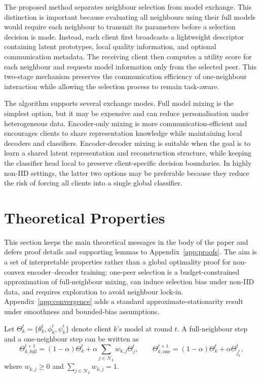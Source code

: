 \documentclass[conference]{IEEEtran}
\begin{document}
The proposed method separates neighbour selection from model exchange. This distinction is important because evaluating all neighbours using their full models would require each neighbour to transmit its parameters before a selection decision is made. Instead, each client first broadcasts a lightweight descriptor containing latent prototypes, local quality information, and optional communication metadata. The receiving client then computes a utility score for each neighbour and requests model information only from the selected peer. This two-stage mechanism preserves the communication efficiency of one-neighbour interaction while allowing the selection process to remain task-aware.

The algorithm supports several exchange modes. Full model mixing is the simplest option, but it may be expensive and can reduce personalisation under heterogeneous data. Encoder-only mixing is more communication-efficient and encourages clients to share representation knowledge while maintaining local decoders and classifiers. Encoder-decoder mixing is suitable when the goal is to learn a shared latent representation and reconstruction structure, while keeping the classifier head local to preserve client-specific decision boundaries. In highly non-IID settings, the latter two options may be preferable because they reduce the risk of forcing all clients into a single global classifier.

\section{Theoretical Properties}
\label{sec:theory}

This section keeps the main theoretical messages in the body of the paper and defers proof details and supporting lemmas to Appendix~\ref{app:proofs}. The aim is a set of interpretable properties rather than a global optimality proof for non-convex encoder--decoder training: one-peer selection is a budget-constrained approximation of full-neighbour mixing, can induce selection bias under non-IID data, and requires exploration to avoid neighbour lock-in. Appendix~\ref{app:convergence} adds a standard approximate-stationarity result under smoothness and bounded-bias assumptions.

Let $\Theta_k^t=\{\theta_k^t,\phi_k^t,\psi_k^t\}$ denote client $k$'s model at round $t$. A full-neighbour step and a one-neighbour step can be written as
\[
\Theta_{k,\mathrm{full}}^{t+1}
=(1-\alpha)\Theta_k^t
+\alpha\sum_{j\in\mathcal{N}_k}w_{k,j}\Theta_j^t,
\qquad
\Theta_{k,\mathrm{one}}^{t+1}
=(1-\alpha)\Theta_k^t+\alpha\Theta_{j_k^t}^t,
\]
where $w_{k,j}\geq0$ and $\sum_{j\in\mathcal{N}_k}w_{k,j}=1$.
\end{document}
